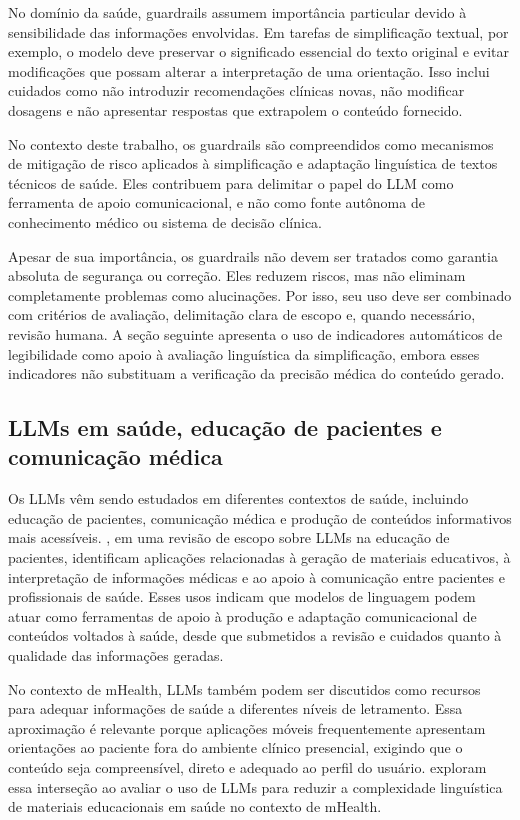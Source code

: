 No domínio da saúde, guardrails assumem importância particular devido à sensibilidade das informações envolvidas. Em tarefas de simplificação textual, por exemplo, o modelo deve preservar o significado essencial do texto original e evitar modificações que possam alterar a interpretação de uma orientação. Isso inclui cuidados como não introduzir recomendações clínicas novas, não modificar dosagens e não apresentar respostas que extrapolem o conteúdo fornecido.

No contexto deste trabalho, os guardrails são compreendidos como mecanismos de mitigação de risco aplicados à simplificação e adaptação linguística de textos técnicos de saúde. Eles contribuem para delimitar o papel do LLM como ferramenta de apoio comunicacional, e não como fonte autônoma de conhecimento médico ou sistema de decisão clínica.

Apesar de sua importância, os guardrails não devem ser tratados como garantia absoluta de segurança ou correção. Eles reduzem riscos, mas não eliminam completamente problemas como alucinações. Por isso, seu uso deve ser combinado com critérios de avaliação, delimitação clara de escopo e, quando necessário, revisão humana. A seção seguinte apresenta o uso de indicadores automáticos de legibilidade como apoio à avaliação linguística da simplificação, embora esses indicadores não substituam a verificação da precisão médica do conteúdo gerado.

\subsection{LLMs em saúde, educação de pacientes e comunicação médica}
\label{sec:llms-saude-educacao-pacientes-comunicacao-medica}

Os LLMs vêm sendo estudados em diferentes contextos de saúde, incluindo educação de pacientes, comunicação médica e produção de conteúdos informativos mais acessíveis. , em uma revisão de escopo sobre LLMs na educação de pacientes, identificam aplicações relacionadas à geração de materiais educativos, à interpretação de informações médicas e ao apoio à comunicação entre pacientes e profissionais de saúde. Esses usos indicam que modelos de linguagem podem atuar como ferramentas de apoio à produção e adaptação comunicacional de conteúdos voltados à saúde, desde que submetidos a revisão e cuidados quanto à qualidade das informações geradas.

No contexto de mHealth, LLMs também podem ser discutidos como recursos para adequar informações de saúde a diferentes níveis de letramento. Essa aproximação é relevante porque aplicações móveis frequentemente apresentam orientações ao paciente fora do ambiente clínico presencial, exigindo que o conteúdo seja compreensível, direto e adequado ao perfil do usuário.  exploram essa interseção ao avaliar o uso de LLMs para reduzir a complexidade linguística de materiais educacionais em saúde no contexto de mHealth.

